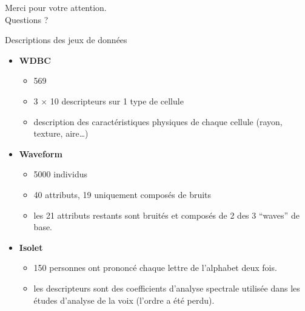 \documentclass[hyperref={pdfpagelabels=false}]{beamer}
\begin{document}
    \begin{frame}
        \begin{center}
            Merci pour votre attention.\\
            Questions ?
        \end{center}
    \end{frame}



    \appendix
    \begin{frame}{Descriptions des jeux de données}
        \begin{itemize}
            \item
                \textbf{WDBC}
                \begin{itemize}
                    \item 569
                    \item 3 $\times$ 10 descripteurs sur 1 type de cellule
                    \item description des caractéristiques physiques de chaque
                        cellule (rayon, texture, aire\ldots)
                \end{itemize}
            \item \textbf{Waveform}
                \begin{itemize}
                    \item 5000 individus
                    \item 40 attributs, 19 uniquement composés de bruits
                    \item les 21 attributs restants sont bruités et composés de
                        2 des 3 ``waves'' de base.
                \end{itemize}
            \item \textbf{Isolet}
                \begin{itemize}
                    \item 150 personnes ont prononcé chaque lettre de
                        l'alphabet deux fois.
                    \item les descripteurs sont des coefficients d'analyse
                        spectrale utilisée dans les études d'analyse de la
                        voix (l'ordre a été perdu).
                \end{itemize}
        \end{itemize}
    \end{frame}
\end{document}
